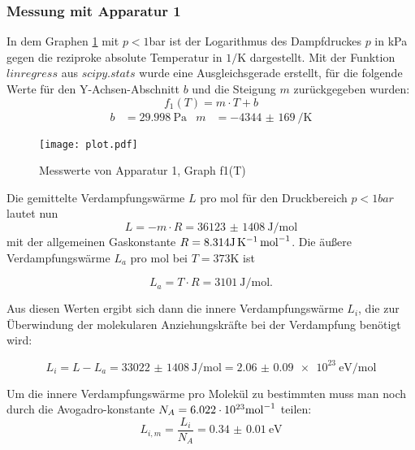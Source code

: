 \subsubsection{Messung mit Apparatur 1}
In dem Graphen \ref{fig:f1(T)} mit $p < 1$\si{bar}
ist der Logarithmus des Dampfdruckes $p$ in \si{\kPa}
gegen die reziproke absolute Temperatur in $1/\si{\kelvin}$ dargestellt.
Mit der Funktion $linregress$ aus $scipy.stats$
wurde eine Ausgleichsgerade erstellt, für die folgende Werte für den
Y-Achsen-Abschnitt $b$ und die Steigung $m$ zurückgegeben wurden:
\begin{equation}
  f_1(T) = m \cdot T + b
\end{equation}
\begin{align}
  b & = \SI{29.998}{\Pa} &  m & = \SI{-4344(169)}{\per\kelvin}
\end{align}

\newpage

\begin{figure}
  \centering
  \texttt{[image: plot.pdf]}
  \caption{Messwerte von Apparatur 1, Graph f1(T)}
  \label{fig:f1(T)}
\end{figure}

Die gemittelte Verdampfungswärme $L$ pro \si{mol} für den Druckbereich
$p < 1\si{bar}$ lautet nun
\begin{equation}
  L = -m \cdot R = \SI{36123(1408)}{\joule\per\mol}
\end{equation}
mit der allgemeinen Gaskonstante\cite{gaskonstante}
$R = 8.314 \si[per-mode=reciprocal]{\joule\per\kelvin\per\mol}$.
Die äußere Verdampfungswärme $L_a$ pro \si{mol} bei $T = 373
\si{\kelvin}$ ist

\begin{equation}
  L_a = T \cdot R = \SI{3101}{\joule\per\mol}.
\end{equation}

Aus diesen Werten ergibt sich dann die innere Verdampfungswärme $L_i$, die
zur Überwindung der molekularen Anziehungskräfte bei der Verdampfung benötigt
wird:

\begin{equation}
  L_i = L - L_a = \SI{33022(1408)}{\joule\per\mol} =
  \SI{2.06(9)e23}{\electronvolt\per\mol}
\end{equation}

Um die innere Verdampfungswärme pro Molekül zu bestimmten muss man noch durch
die Avogadro-konstante\cite{avogadro}
$N_A = 6.022 \cdot 10^{23} \si[per-mode=reciprocal]{\per\mol}$ teilen:
\begin{equation}
  L_{i,m} = \frac{L_i}{N_A} = \SI{0.34(1)}{\electronvolt}
\end{equation}

